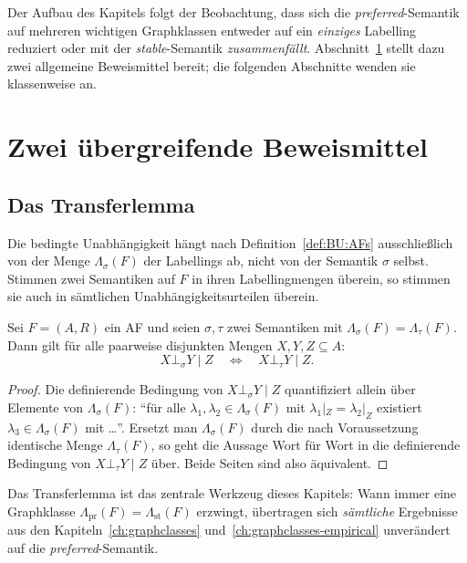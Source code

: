 Der Aufbau des Kapitels folgt der Beobachtung, dass sich die
\textit{preferred}-Semantik auf mehreren wichtigen Graphklassen entweder auf
ein \emph{einziges} Labelling reduziert oder mit der \textit{stable}-Semantik
\emph{zusammenf\"allt}. Abschnitt~\ref{sec:gcp-mittel} stellt dazu zwei
allgemeine Beweismittel bereit; die folgenden Abschnitte wenden sie klassenweise
an.

\section{Zwei \"ubergreifende Beweismittel}
\label{sec:gcp-mittel}

\subsection{Das Transferlemma}
\label{subsec:gcp-transfer}

Die bedingte Unabh\"angigkeit h\"angt nach Definition~\ref{def:BU:AFs}
ausschlie\ss lich von der Menge \(\Lambda_\sigma(F)\) der Labellings ab, nicht
von der Semantik \(\sigma\) selbst. Stimmen zwei Semantiken auf \(F\) in ihren
Labellingmengen \"uberein, so stimmen sie auch in s\"amtlichen
Unabh\"angigkeitsurteilen \"uberein.

\begin{Lemma}[Transferlemma]
    \label{lem:gcp-transfer}
    Sei \(F=(A,R)\) ein AF und seien \(\sigma,\tau\) zwei Semantiken mit
    \(\Lambda_\sigma(F)=\Lambda_\tau(F)\). Dann gilt f\"ur alle paarweise
    disjunkten Mengen \(X,Y,Z\subseteq A\):
    \[
        X\bot_\sigma Y\mid Z
        \quad\Longleftrightarrow\quad
        X\bot_\tau Y\mid Z.
    \]
\end{Lemma}

\begin{proof}
    Die definierende Bedingung von \(X\bot_\sigma Y\mid Z\) quantifiziert allein
    \"uber Elemente von \(\Lambda_\sigma(F)\): \enquote{f\"ur alle
    \(\lambda_1,\lambda_2\in\Lambda_\sigma(F)\) mit \(\lambda_1|_Z=\lambda_2|_Z\)
    existiert \(\lambda_3\in\Lambda_\sigma(F)\) mit \dots}. Ersetzt man
    \(\Lambda_\sigma(F)\) durch die nach Voraussetzung identische Menge
    \(\Lambda_\tau(F)\), so geht die Aussage Wort f\"ur Wort in die definierende
    Bedingung von \(X\bot_\tau Y\mid Z\) \"uber. Beide Seiten sind also
    \"aquivalent.
\end{proof}

Das Transferlemma ist das zentrale Werkzeug dieses Kapitels: Wann immer eine
Graphklasse \(\Lambda_{\mathrm{pr}}(F)=\Lambda_{\mathrm{st}}(F)\) erzwingt,
\"ubertragen sich \emph{s\"amtliche} Ergebnisse aus den
Kapiteln~\ref{ch:graphclasses} und~\ref{ch:graphclasses-empirical} unver\"andert
auf die \textit{preferred}-Semantik.

